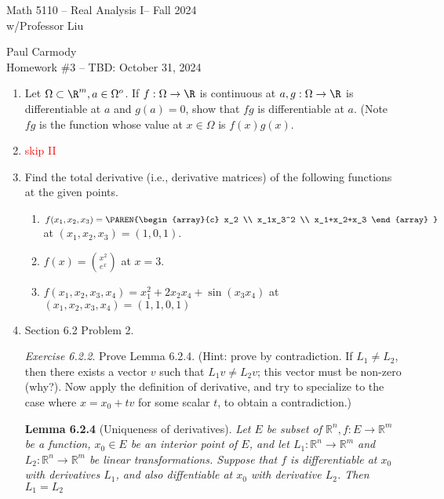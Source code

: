 \documentclass[10pt,a4paper]{report}
\newcommand{\CLASSNAME}{Math 5110 -- Real Analysis I}
\newcommand{\STUDENTNAME}{Paul Carmody}
\newcommand{\ASSIGNMENT}{Homework \#3 }
\newcommand{\DUEDATE}{TBD: October 31, 2024}
\newcommand{\SEMESTER}{Fall 2024}
\newcommand{\RED}[1]{\textcolor{red}{#1}}
\begin{document}
\begin{center}
	\Large{\CLASSNAME -- \SEMESTER} \\
	\large{ w/Professor Liu}
\end{center}
\begin{center}
	\STUDENTNAME \\
	\ASSIGNMENT -- \DUEDATE\\
\end{center} 

\begin{enumerate}[label=\Roman*.]
\item Let $\Omega \subset \R^m, a \in \Omega^o$.  If $f:\Omega \to \R$ is continuous at $a, g: \Omega \to \R$ is differentiable at $a$ and $g(a) = 0$, show that $fg$ is differentiable at $a$.  (Note $fg$ is the function whose value at $x \in \Omega$ is $f(x)g(x)$.

\item \RED{skip II}

\item Find the total derivative (i.e., derivative matrices) of the following functions at the given points.
\begin{enumerate}[label=(\alph*)]
	\item $f(x_1,x_2,x_3) = \PAREN{\begin{array}{c}
		x_2 \\ 
		x_1x_3^2 \\
		x_1+x_2+x_3
	\end{array} }$ at $(x_1,x_2,x_3) = (1,0,1)$.
	
	\item $f(x) = \binom{x^2}{e^x}$ at $x=3$.
	
	\item $f(x_1,x_2,x_3,x_4) = x_1^2+2x_2x_4+\sin(x_3x_4)$ at $(x_1,x_2,x_3,x_4) = (1,1,0,1)$
\end{enumerate}

\item Section 6.2 Problem 2.

	\textit{Exercise 6.2.2}.  Prove Lemma 6.2.4. (Hint: prove by contradiction.  If $L_1 \ne L_2$, then there exists a vector $v$ such that $L_1v \ne L_2v$; this vector must be non-zero (why?).  Now apply the definition of derivative, and try to specialize to the case where $x=x_0+tv$ for some scalar $t$, to obtain a contradiction.)

\newcommand{\RRR}{\mathbb{R}}	
	\textbf{Lemma 6.2.4} (Uniqueness of derivatives).  \textit{Let $E$ be  subset of $\RRR^n, f: E\to \RRR^m$ be a function, $x_0\in E$ be an interior point of $E$, and let $L_1: \RRR^n\to \RRR^m$ and $L_2: \RRR^n\to \RRR^m$ be linear transformations.  Suppose that $f$ is differentiable at $x_0$ with derivatives $L_1$, and also diffentiable at $x_0$ with derivative $L_2$.  Then $L_1=L_2$}
	

\end{enumerate}
\end{document}
